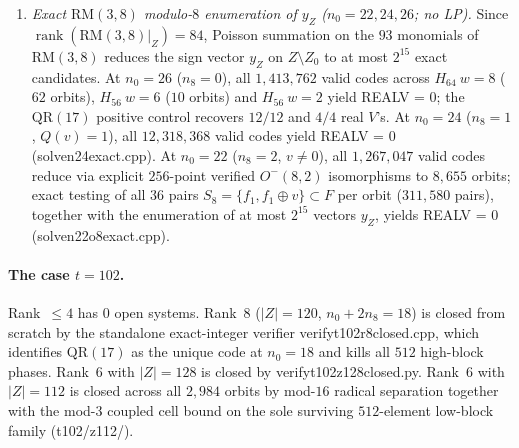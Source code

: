 \documentclass[11pt]{article}
\theoremstyle{definition}
\newcommand{\rank}{\operatorname{rank}}
\newcommand{\code}[1]{{\ttfamily\small\renewcommand{\_}{\textunderscore\allowbreak}#1}}
\begin{document}
\begin{enumerate}[nosep]
  \item \emph{Exact $\mathrm{RM}(3,8)$ modulo-$8$ enumeration of $y_Z$ ($n_0 = 22, 24, 26$; no LP).} Since $\rank(\mathrm{RM}(3,8)|_Z) = 84$, Poisson summation on the $93$ monomials of $\mathrm{RM}(3,8)$ reduces the sign vector $y_Z$ on $Z \setminus Z_0$ to at most $2^{15}$ exact candidates. At $n_0 = 26$ ($n_8 = 0$), all $1{,}413{,}762$ valid codes across $H_{64}\ w=8$ ($62$ orbits), $H_{56}\ w=6$ ($10$ orbits) and $H_{56}\ w=2$ yield \code{REAL\_V = 0}; the $\mathrm{QR}(17)$ positive control recovers $12/12$ and $4/4$ real $V$'s. At $n_0 = 24$ ($n_8 = 1$, $Q(v)=1$), all $12{,}318{,}368$ valid codes yield \code{REAL\_V = 0} (\code{solve\_n24\_exact.cpp}). At $n_0 = 22$ ($n_8 = 2$, $v \neq 0$), all $1{,}267{,}047$ valid codes reduce via explicit $256$-point verified $O^-(8,2)$ isomorphisms to $8{,}655$ orbits; exact testing of all $36$ pairs $S_8 = \{f_1, f_1 \oplus v\} \subset F$ per orbit ($311{,}580$ pairs), together with the enumeration of at most $2^{15}$ vectors $y_Z$, yields \code{REAL\_V = 0} (\code{solve\_n22\_o8\_exact.cpp}).
\end{enumerate}

\paragraph{The case $t = 102$.}
Rank~$\le 4$ has $0$ open systems.
Rank~$8$ ($|Z| = 120$, $n_0 + 2n_8 = 18$) is closed from scratch by the standalone exact-integer verifier \code{verify\_t102\_r8\_closed.cpp}, which identifies $\mathrm{QR}(17)$ as the unique code at $n_0 = 18$ and kills all $512$ high-block phases.
Rank~$6$ with $|Z| = 128$ is closed by \code{verify\_t102\_z128\_closed.py}.
Rank~$6$ with $|Z| = 112$ is closed across all $2{,}984$ orbits by mod-$16$ radical separation together with the mod-$3$ coupled cell bound on the sole surviving $512$-element low-block family (\code{t102/z112/}).
\end{document}
